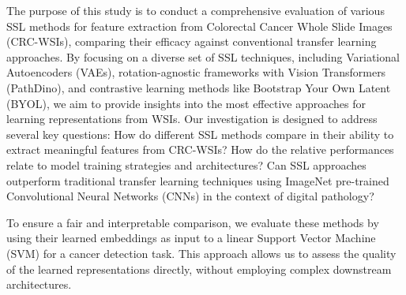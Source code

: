 \documentclass[peerreview]{IEEEtran}
\begin{document}
The purpose of this study is to conduct a comprehensive evaluation of various SSL methods for feature extraction from Colorectal Cancer Whole Slide Images (CRC-WSIs), comparing their efficacy against conventional transfer learning approaches. By focusing on a diverse set of SSL techniques, including Variational Autoencoders (VAEs\cite{vae}), rotation-agnostic frameworks with Vision Transformers (PathDino\cite{pathdino}), and contrastive learning methods like Bootstrap Your Own Latent (BYOL\cite{byol}), we aim to provide insights into the most effective approaches for learning representations from WSIs. Our investigation is designed to address several key questions: How do different SSL methods compare in their ability to extract meaningful features from CRC-WSIs? How do the relative performances relate to model training strategies and architectures? Can SSL approaches outperform traditional transfer learning techniques using ImageNet pre-trained Convolutional Neural Networks (CNNs) in the context of digital pathology?

To ensure a fair and interpretable comparison, we evaluate these methods by using their learned embeddings as input to a linear Support Vector Machine (SVM) for a cancer detection task. This approach allows us to assess the quality of the learned representations directly, without employing complex downstream architectures. %
\end{document}
